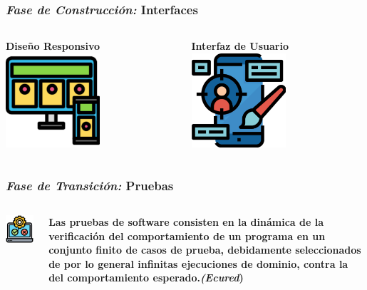 \documentclass[xcolor=dvipsnames, xcolor=table]{beamer}
\begin{document}
\begin{frame}
    \frametitle{\textit{Fase de Construcción:} Interfaces}
    \begin{columns}
      \begin{column}{0.5\textwidth}
        \centering\textbf{\textcolor{color3}{ Diseño Responsivo}\vspace{6mm}}
        \centering\includegraphics[width=3.5cm]{responsive}
      \end{column}
      \begin{column}{0.5\textwidth}
        \centering\textbf{\textcolor{color3}{ Interfaz de Usuario}\vspace{6mm}}
        \includegraphics[width=3.5cm]{ui}
      \end{column}
    \end{columns}
\end{frame}

\begin{frame}
    \frametitle{\textit{Fase de Transición:} Pruebas}
    \begin{columns}
      \begin{column}{0.5\textwidth}

        \centering\includegraphics[width=4.5cm]{testing}
      \end{column}
      \begin{column}{0.5\textwidth}
        \centering\textbf{{\small Las pruebas de software consisten en la dinámica de la verificación del comportamiento de un programa en un conjunto finito de casos de prueba, debidamente seleccionados de por lo general infinitas ejecuciones de dominio, contra la del comportamiento esperado.\textit{(Ecured})}\vspace{2mm}}
      \end{column}
    \end{columns}
\end{frame}
\end{document}
